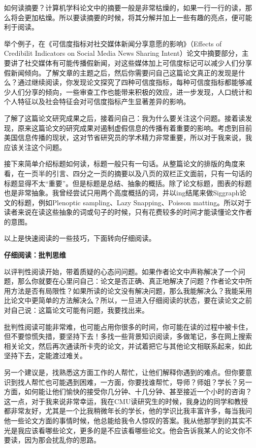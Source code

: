 如何读摘要？计算机学科论文中的摘要一般是非常枯燥的，如果一行一行的读，那么将会更加枯燥。所以要读摘要的时候，将其分解并加上一些有趣的亮点，便可能利于阅读。

举个例子，在《可信度指标对社交媒体新闻分享意愿的影响》（Effects of Credibilit Indicators on Social Media News Sharing Intent）论文中摘要部分，主要讲了社交媒体有可能传播假新闻，对这些媒体加上可信度标记可以减少人们分享假新闻倾向。了解文章的主题之后，然后你需要问自己这篇论文真正的发现是什么？通过继续阅读，你发现论文探究了四种可信度指标，每种可信度指标都能够减少人们分享的倾向，一些审查工作也能带来积极的效应，进一步发现，人口统计和个人特征以及社会特征会对可信度指标产生显著差异的影响。

了解了这篇论文研究成果之后，接着问自己：我为什么要关注这个问题。接着读发现，原来这篇论文的研究成果对遏制虚假信息的传播有着重要的影响。考虑到目前美国信息传播的现状，这对节省研究员的学术精力非常重要，所以对于我来说，我应该关注这个问题。

接下来简单介绍标题如何读，标题一般只有一句话。从整篇论文的排版的角度来看，在一页半的引言、四分之一页的摘要以及八页的双栏正文面前，只有一句话的标题显得不太“重要”。但是标题是总结、抽象的概括。除了论文标题，图表的标题也是非常抽象。我曾经尝试只用两个高度概括的词，并以ing结尾来做Siggraph论文的标题，例如Plenoptic sampling、Lazy Snapping、Poisson matting。所以对于读者来说在读这些抽象的词或句子的时候，只有花费较多的时间才能读懂论文作者的意图。

以上是快速阅读的一些技巧，下面转向仔细阅读。



{\bf 仔细阅读：批判思维}

以评判性阅读开始，带着质疑的心态问问题。如果作者论文中声称解决了一个问题，那么你就要在心里问自己：论文是否正确、真正地解决了问题？作者论文中所用方法是否有局限性？如果所读的论文没有解决问题，那么我能解决么？我能采用比论文中更简单的方法解决么？所以，一旦进入仔细阅读的状态，要在读论文之前对自己说：这篇论文可能有问题，我要找出来。


批判性阅读可能非常难，也可能占用你很多的时间，你可能在读的过程中被卡住，但不要惊慌失措，要坚持下去！多找一些背景知识阅读，多做笔记，多在网上搜索相关论文，然后再次通读所卡壳的论文，并试着把它与其他论文相联系起来，如此坚持下去，定能渡过难关。

另一个建议是，找熟悉这方面工作的人帮忙，让他们解释你遇到的难点。但你要意识到找人帮忙也可能遇到困难，一方面，你要找谁帮忙，导师？师姐？学长？另一方面，如何能让他们愉快的接受你几分钟、十几分钟、甚至接近一个小时的咨询？这一点，对于我来说非常幸运，我在CMU读研究生的时候，我身边的同学和教授都非常友好，尤其是一个比我稍微年长的学长，他的学识比我丰富许多，每当我问他一些论文方面的事情时候，他总能给我令人惊叹的答案。我从他那学到的其实不光是我应该看哪些论文，更多的是不应该看哪些论文。他会告诉我某人的论文你不要读，因为那会扰乱你的思路。
 
